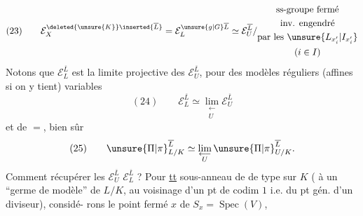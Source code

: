 \[
(23)\qquad
\mathcal E_X^{\deleted{\unsure{K}}\inserted{\overline L}}
=\mathcal E_L^{\unsure{g|G}\overline L}
\simeq\mathcal E_U^{\overline L}/\begin{gathered}\text{ss-groupe fermé}\\\text{inv. engendré}\\\text{par les }\unsure{L_{x_i'}|I_{x_i'}}\\(i\in I)\end{gathered}
\]
Notons que $\mathcal E_L^{\overline L}$ est la limite
projective des $\mathcal E_U^{\overline L}$, pour des
modèles réguliers (affines si on y tient)
variables
\[
(24)\qquad\mathcal E_L^{\overline L}\simeq\lim_{\substack{\longleftarrow\\U}}\mathcal E_U^{\overline L}
\]
et de $=$, bien sûr
\[
(25)\qquad\unsure{\Pi|\pi}_{L/K}^{\overline L}\simeq\lim_{\substack{\longleftarrow\\U}}\unsure{\Pi|\pi}_{U/K}^{\overline L}.
\]
Comment récupérer les $\mathcal E_U^{\overline L}$ 
$\mathcal E_L^{\overline L}$ ? Pour \uline{tt}
sous-anneau  de  de type
 sur $K$ ( à un
``germe de modèle'' de $L/K$, au
voisinage d'un pt de codim $1$ i.e.
du pt gén. d'un diviseur), considé-\newline
rons le point fermé $x$ de $S_x=\operatorname{Spec}(V)$,

\margin{Dans les\newline
considérations qui\newline
suivent, $K$ (et $X,U$)\newline
ne jouent provisoirement\newline
aucun rôle --- \unsure{(|[}Mais on pourrait\newline
``plus gén.'' \unsure{regarder|remplacer} groupes de décomp.\newline
\deleted{\unsure{de dimension relative}} d'un des ``$U$''\newline
\uline{mais seulement} \uline{\unsure{épis-comp|épi-s-comp|épi-scop}} (la ``généralisation'' étant\newline
triviale,\newline
$\mathcal E_L\longrightarrow\mathcal E_U$)}



